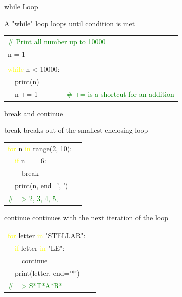 \documentclass[serif, aspectratio=169]{beamer}
\newcommand{\tgreen}[1]{\textcolor{green}{#1}}
\newcommand{\tyellow}[1]{\textcolor{yellow}{#1}}
\newcommand{\tpurple}[1]{\textcolor{purple!50}{#1}}
\newenvironment{CLI} %
    {
    \noindent
    \ttfamily 
    \footnotesize
    \begin{tcolorbox}[colback=gray!150,colframe=black]
    \color{white}
    \begin{tabular}{p{4.5cm}p{7.5cm}}
    }
    { 
    \end{tabular}
    \end{tcolorbox}
    }
\begin{document}
\begin{frame}{while Loop}
    \begin{block}{A "while" loop loops until condition is met}
        \vspace{2pt}
        \begin{CLI}
            \multicolumn{2}{l}{\tgreen{\# Print all number up to 10000}} \\
            n = 1 & \\
            \pause
            & \\
            \tyellow{while} n < 10000: & \\
            ~~\tpurple{print}(n) & \\
            ~~n += 1 & \tgreen{\# += is a shortcut for an addition} \\
        \end{CLI}
    \end{block}
\end{frame}

\begin{frame}{break and continue}
    \begin{block}{break breaks out of the smallest enclosing loop}
        \vspace{2pt}
        \begin{CLI}
            \tyellow{for} n \tyellow{in} range(2, 10): & \\
            ~~\tyellow{if} n == 6: & \\
            ~~~~\tpurple{break} & \\
            ~~\tpurple{print}(n, end=', ') & \\ 
            \tgreen{\# => 2, 3, 4, 5,} & \\
        \end{CLI}
    \end{block}
    \pause
    \begin{block}{continue continues with the next iteration of the loop}
        \vspace{2pt}
        \begin{CLI}
            \tyellow{for} letter \tyellow{in} "STELLAR": & \\
            ~~\tyellow{if} letter \tyellow{in} "LE": & \\
            ~~~~\tpurple{continue} & \\
            ~~\tpurple{print}(letter, end='*') & \\
            \tgreen{\# => S*T*A*R*} & \\
        \end{CLI}
    \end{block}
\end{frame}
\end{document}
